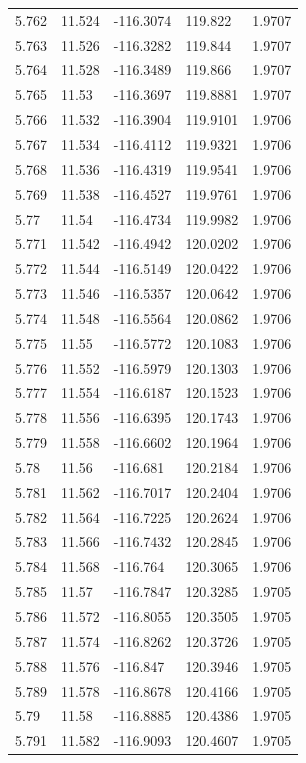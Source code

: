 \begin{tabular}{lllll}
5.762 & 11.524 & -116.3074 & 119.822 & 1.9707 \\
5.763 & 11.526 & -116.3282 & 119.844 & 1.9707 \\
5.764 & 11.528 & -116.3489 & 119.866 & 1.9707 \\
5.765 & 11.53 & -116.3697 & 119.8881 & 1.9707 \\
5.766 & 11.532 & -116.3904 & 119.9101 & 1.9706 \\
5.767 & 11.534 & -116.4112 & 119.9321 & 1.9706 \\
5.768 & 11.536 & -116.4319 & 119.9541 & 1.9706 \\
5.769 & 11.538 & -116.4527 & 119.9761 & 1.9706 \\
5.77 & 11.54 & -116.4734 & 119.9982 & 1.9706 \\
5.771 & 11.542 & -116.4942 & 120.0202 & 1.9706 \\
5.772 & 11.544 & -116.5149 & 120.0422 & 1.9706 \\
5.773 & 11.546 & -116.5357 & 120.0642 & 1.9706 \\
5.774 & 11.548 & -116.5564 & 120.0862 & 1.9706 \\
5.775 & 11.55 & -116.5772 & 120.1083 & 1.9706 \\
5.776 & 11.552 & -116.5979 & 120.1303 & 1.9706 \\
5.777 & 11.554 & -116.6187 & 120.1523 & 1.9706 \\
5.778 & 11.556 & -116.6395 & 120.1743 & 1.9706 \\
5.779 & 11.558 & -116.6602 & 120.1964 & 1.9706 \\
5.78 & 11.56 & -116.681 & 120.2184 & 1.9706 \\
5.781 & 11.562 & -116.7017 & 120.2404 & 1.9706 \\
5.782 & 11.564 & -116.7225 & 120.2624 & 1.9706 \\
5.783 & 11.566 & -116.7432 & 120.2845 & 1.9706 \\
5.784 & 11.568 & -116.764 & 120.3065 & 1.9706 \\
5.785 & 11.57 & -116.7847 & 120.3285 & 1.9705 \\
5.786 & 11.572 & -116.8055 & 120.3505 & 1.9705 \\
5.787 & 11.574 & -116.8262 & 120.3726 & 1.9705 \\
5.788 & 11.576 & -116.847 & 120.3946 & 1.9705 \\
5.789 & 11.578 & -116.8678 & 120.4166 & 1.9705 \\
5.79 & 11.58 & -116.8885 & 120.4386 & 1.9705 \\
5.791 & 11.582 & -116.9093 & 120.4607 & 1.9705 \\

\end{tabular}
